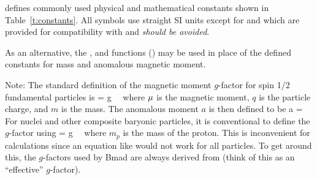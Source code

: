 {{{\bmad defines commonly used physical and mathematical constants shown in Table~\ref{t:constants}.
All symbols use straight SI units except for  and  which are provided for
compatibility with \mad and {\large\em should be avoided}.

As an alternative, the , and  functions
() may be used in place of the defined constants for mass and anomalous
magnetic moment.

Note: The standard definition of the magnetic moment $g$-factor for spin 1/2 fundamental particles is
\Begineq
  \Bf\mu = g \,  \, \bfS
  \label{mgq2m}
\Endeq
where ${\bf \mu}$ is the magnetic moment, $q$ is the particle charge, and $m$ is the mass. The
anomalous moment $a$ is then defined to be
\Begineq
  a = 
\Endeq
For nuclei and other composite baryonic particles, it is conventional to define the $g$-factor using
\Begineq
  \Bf\mu = g \,  \, \bfS
  \label{mgq2m2}
\Endeq
where $m_p$ is the mass of the proton. This is inconvenient for calculations since an equation like
 would not work for all particles. To get around this, the $g$-factors used by Bmad are
always derived from  (think of this as an ``effective'' $g$-factor).

}}}
